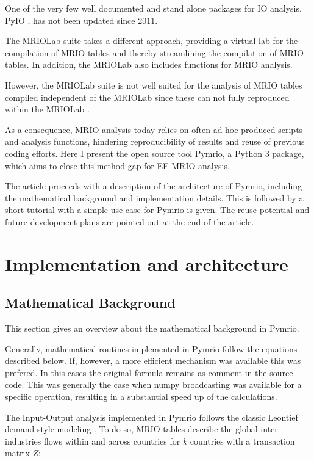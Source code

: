 \documentclass{jors}
\begin{document}
{One of the very few well documented and stand alone packages for IO analysis, PyIO \cite{nazara2003}, has not been updated since 2011.

The MRIOLab suite \cite{geschke2017,lenzen2017} takes a different approach, providing a virtual lab for the compilation of MRIO tables and thereby streamlining the compilation of MRIO tables. In addition, the MRIOLab also includes functions for MRIO analysis.

However, the MRIOLab suite is not well suited for the analysis of MRIO tables compiled independent of the MRIOLab since these can not fully reproduced within the MRIOLab \cite{rahman2017,reyes2017}.

As a consequence, MRIO analysis today relies on often ad-hoc produced scripts and analysis functions, hindering reproducibility of results and reuse of previous coding efforts.
Here I present the open source tool Pymrio, a Python 3 package, which aims to close this method gap for EE MRIO analysis.

The article proceeds with a description of the architecture of Pymrio, including the mathematical background and implementation details. This is followed by  a short tutorial with a simple use case for Pymrio is given. 
The reuse potential and future development plans are pointed out at the end of the article.


\section*{Implementation and architecture}

\subsection*{Mathematical Background}

This section gives an overview about the mathematical background in Pymrio. 

Generally, mathematical routines implemented in Pymrio follow the equations described below.
If, however, a more efficient mechanism was available this was prefered.
In this cases the original formula remains as comment in the source code.
This was generally the case when numpy broadcasting \cite{vanderwalt2011} was available for a specific operation, resulting in a substantial speed up of the calculations.

The Input-Output analysis implemented in Pymrio follows the classic Leontief demand-style modeling  \cite{leontief1970}.
To do so, MRIO tables describe the global inter-industries flows within and across countries for $k$ countries with a transaction matrix $Z$:

}
\end{document}
